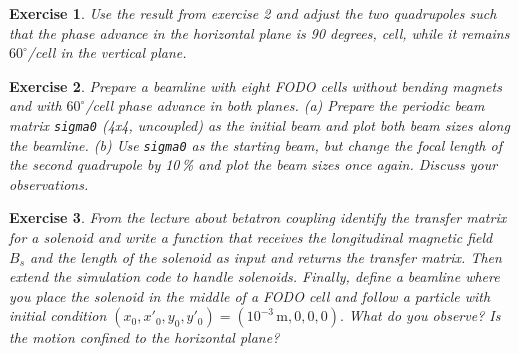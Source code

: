 \documentclass{article}
\newtheorem{exercise}{Exercise}
\begin{document}
\begin{exercise}  
Use the result from exercise 2 and adjust the two quadrupoles 
  such that the phase advance in the horizontal plane is 90 degrees, cell, while it 
  remains $60^\circ$/cell in the vertical plane. 
\end{exercise}  

\begin{exercise} 
Prepare a beamline with eight FODO cells without bending magnets
  and with $60^\circ$/cell phase advance in both planes. (a) Prepare the periodic beam 
  matrix {\tt sigma0} (4x4, uncoupled) as the initial beam and plot both beam sizes along the 
beamline. (b) Use {\tt sigma0} as the starting beam, but change the focal length of the 
  second quadrupole by 10\,\% and plot the beam sizes once again. Discuss your observations.
\end{exercise}  

\begin{exercise} 
From the lecture about betatron coupling identify the transfer 
  matrix for a solenoid and write a function that receives the longitudinal magnetic
  field $B_s$ and the length of the solenoid as input and returns the transfer matrix. 
  Then extend the simulation code to handle solenoids. Finally, define a beamline where 
  you place the solenoid in the middle of a FODO cell and follow a particle with initial 
  condition $(x_0,x'_0,y_0,y'_0)=(10^{-3}\,\mathrm{m},0,0,0).$ What do you observe? Is the motion 
  confined to the horizontal plane? 
\end{exercise}
\end{document}
